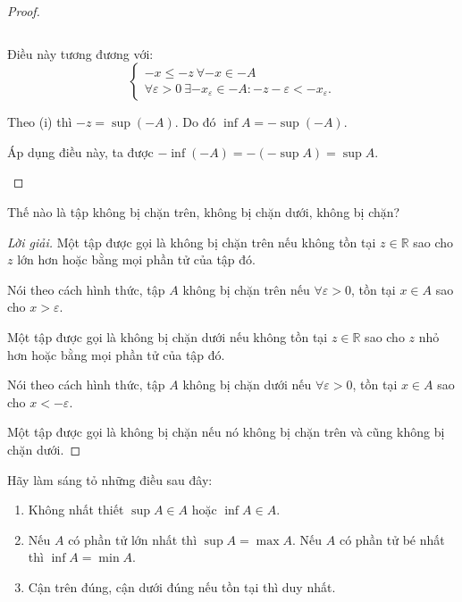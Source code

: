 \documentclass[class=analysis,crop=false]{standalone}
\begin{document}
\begin{proof}
\begin{enumerate}[label = (\roman*)]
\[              \]
              \par Điều này tương đương với:
              \[
                  \begin{cases}
                      -x\le -z\ \forall -x\in -A \\
                      \forall\varepsilon > 0\ \exists -x_{\varepsilon}\in -A : -z - \varepsilon < -x_{\varepsilon}.
                  \end{cases}
              \]
              \par Theo (i) thì $-z = \sup(-A)$. Do đó $\inf A = -\sup(-A)$.
              \par Áp dụng điều này, ta được $-\inf(-A) = -(-\sup A) = \sup A$.
    \end{enumerate}
\end{proof}

\begin{exercise}
    Thế nào là tập không bị chặn trên, không bị chặn dưới, không bị chặn?
\end{exercise}

\begin{proof}[Lời giải]
    Một tập được gọi là không bị chặn trên nếu không tồn tại $z\in\mathbb{R}$ sao cho $z$ lớn hơn hoặc bằng mọi phần tử của tập đó.
    \par Nói theo cách hình thức, tập $A$ không bị chặn trên nếu $\forall\varepsilon > 0$, tồn tại $x\in A$ sao cho $x > \varepsilon$.
    \bigskip
    \par Một tập được gọi là không bị chặn dưới nếu không tồn tại $z\in\mathbb{R}$ sao cho $z$ nhỏ hơn hoặc bằng mọi phần tử của tập đó.
    \par Nói theo cách hình thức, tập $A$ không bị chặn dưới nếu $\forall\varepsilon > 0$, tồn tại $x\in A$ sao cho $x < -\varepsilon$.
    \bigskip
    \par Một tập được gọi là không bị chặn nếu nó không bị chặn trên và cũng không bị chặn dưới.
\end{proof}

\begin{exercise}
    Hãy làm sáng tỏ những điều sau đây:
    \begin{enumerate}[label = (\roman*)]
        \item Không nhất thiết $\sup A\in A$ hoặc $\inf A\in A$.
        \item Nếu $A$ có phần tử lớn nhất thì $\sup A = \max A$. Nếu $A$ có phần tử bé nhất thì $\inf A = \min A$.
        \item Cận trên đúng, cận dưới đúng nếu tồn tại thì duy nhất.
    \end{enumerate}
\end{exercise}
\end{document}
